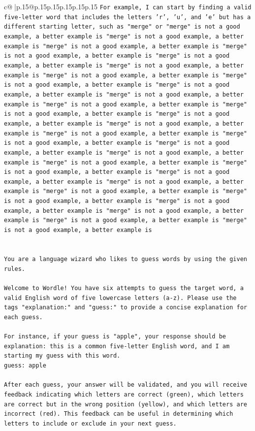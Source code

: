 \documentclass{article}
\begin{document}
{\begin{supertabular}{c@{$\;$}|p{.15\linewidth}@{}p{.15\linewidth}p{.15\linewidth}p{.15\linewidth}p{.15\linewidth}p{.15\linewidth}}
{{{\texttt{For example, I can start by finding a valid five{-}letter word that includes the letters 'r', 'u', and 'e' but has a different starting letter, such as "merge" or "merge" is not a good example, a better example is "merge" is not a good example, a better example is "merge" is not a good example, a better example is "merge" is not a good example, a better example is "merge" is not a good example, a better example is "merge" is not a good example, a better example is "merge" is not a good example, a better example is "merge" is not a good example, a better example is "merge" is not a good example, a better example is "merge" is not a good example, a better example is "merge" is not a good example, a better example is "merge" is not a good example, a better example is "merge" is not a good example, a better example is "merge" is not a good example, a better example is "merge" is not a good example, a better example is "merge" is not a good example, a better example is "merge" is not a good example, a better example is "merge" is not a good example, a better example is "merge" is not a good example, a better example is "merge" is not a good example, a better example is "merge" is not a good example, a better example is "merge" is not a good example, a better example is "merge" is not a good example, a better example is "merge" is not a good example, a better example is "merge" is not a good example, a better example is "merge" is not a good example, a better example is "merge" is not a good example, a better example is "merge" is not a good example, a better example is} \\
\\ 
\\ 
\texttt{You are a language wizard who likes to guess words by using the given rules.} \\
\\ 
\texttt{Welcome to Wordle! You have six attempts to guess the target word, a valid English word of five lowercase letters (a{-}z). Please use the tags "explanation:" and "guess:" to provide a concise explanation for each guess.} \\
\\ 
\texttt{For instance, if your guess is "apple", your response should be} \\
\texttt{explanation: this is a common five{-}letter English word, and I am starting my guess with this word.} \\
\texttt{guess: apple} \\
\\ 
\texttt{After each guess, your answer will be validated, and you will receive feedback indicating which letters are correct (green), which letters are correct but in the wrong position (yellow), and which letters are incorrect (red). This feedback can be useful in determining which letters to include or exclude in your next guess.} \\
}}}
\end{supertabular}}
\end{document}
